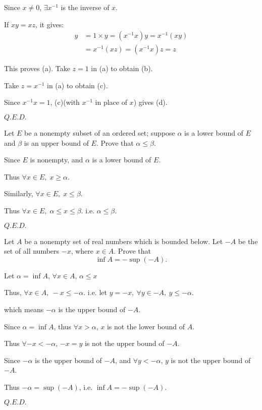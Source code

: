 \begin{Proof}
Since $x\neq0$, $\exists x^{-1}$ is the inverse of $x$. 

If $xy=xz$, it gives:
\begin{align*}
y &=1\times y=(x^{-1} x)y=x^{-1}(xy) \\
  &=x^{-1}(xz)=(x^{-1}x)z=z
\end{align*}

This proves (a). Take $z=1$ in (a) to obtain (b).

Take $z=x^{-1}$ in (a) to obtain (c).

Since $x^{-1}x=1$, (c)(with $x^{-1}$ in place of $x$) gives (d).

\hfill$Q.E.D.$\qedhere\hspace{42pt}
\end{Proof}
\begin{question}{}{}
Let $E$ be a nonempty subset of an ordered set;
suppose $\alpha$ is a lower bound of $E$ 
and $\beta$ is an upper bound of $E$.
Prove that $\alpha\le\beta$.
\end{question}
\begin{Proof}
Since $E$ is nonempty, and $\alpha$ is a lower bound of $E$.

Thus $\forall x\in E,\;x\ge\alpha$.

Similarly, $\forall x\in E,\;x\le\beta$.

Thus $\forall x\in E,\;\alpha\le x\le\beta$.
i.e. $\alpha\le\beta$.

\hfill$Q.E.D.$\qedhere\hspace{42pt}
\end{Proof}
\begin{question}{}{}
Let $A$ be a nonempty set of real numbers which is bounded below.
Let $-A$ be the set of all numbers $-x$, where $x\in A$.
Prove that 
$$\inf A=-\sup(-A).$$
\end{question}
\begin{Proof}
Let $\alpha=\inf A$, $\forall x\in A$, $\alpha\le x$

Thus, $\forall x\in A,\:-x\le-\alpha$. i.e. let $y=-x,\:\forall y\in-A,\:y\le-\alpha$. 

which means $-\alpha$ is the upper bound of $-A$.

Since $\alpha=\inf A$, thus $\forall x>\alpha$,
$x$ is not the lower bound of $A$.

Thus $\forall-x<-\alpha$, $-x=y$ is not the upper bound of $-A$.

Since $-\alpha$ is the upper bound of $-A$,
and $\forall y<-\alpha$, $y$ is not the upper bound of $-A$.

Thus $-\alpha=\sup(-A)$, i.e. $\inf A=-\sup(-A)$.

\hfill$Q.E.D.$\qedhere\hspace{42pt}
\end{Proof}
